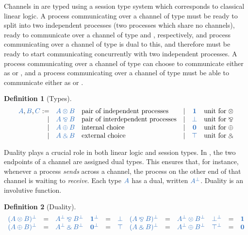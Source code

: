 \documentclass[draft,submission,copyright,creativecommons]{eptcs}
\newtheorem{definition}{Definition}
\begin{document}
Channels in \cp are typed using a session type system which corresponds to
classical linear logic.
A process communicating over a channel of type  must be ready to
split into two independent processes (two processes which share no
channels), ready to communicate over a channel of type  and ,
respectively, and process communicating over a channel of type  is
dual to this, and therefore must be ready to start communicating concurrently
with two independent processes.
A process communicating over a channel of type  can choose to
communicate either as  or , and a process communicating over a
channel of type  must be able to communicate either as  or
.
\begin{definition}[Types]\label{def:cp-types}
  \[
    \begin{array}{rclrcl}
      \ty{A}, \ty{B}, \ty{C}
           :=& \ty{A \tens B} &\text{pair of independent processes}
      &  \mid& \ty{\one}      &\text{unit for} \; {\tens}
      \\ \mid& \ty{A \parr B} &\text{pair of interdependent processes}
      &  \mid& \ty{\bot}      &\text{unit for} \; {\parr}
      \\ \mid& \ty{A \plus B} &\text{internal choice}
      &  \mid& \ty{\nil}      &\text{unit for} \; {\plus}
      \\ \mid& \ty{A \with B} &\text{external choice}
      &  \mid& \ty{\top}      &\text{unit for} \; {\with}
    \end{array}
  \]
\end{definition}
Duality plays a crucial role in both linear logic and session types.
In \cp, the two endpoints of a channel are assigned dual types.
This ensures that, for instance, whenever a process \emph{sends} across a
channel, the process on the other end of that channel is waiting to
\emph{receive}.
Each type $\ty{A}$ has a dual, written $\ty{A^\bot}$.
Duality is an involutive function.
\begin{definition}[Duality]\label{def:cp-negation}
  \[
    \begin{array}{lcllcllcllcl}
         \ty{(A \tens B)^\bot} &=& \ty{A^\bot \parr B^\bot}
      &  \ty{\one^\bot}        &=& \ty{\bot}
      &  \ty{(A \parr B)^\bot} &=& \ty{A^\bot \tens B^\bot}
      &  \ty{\bot^\bot}        &=& \ty{\one}
      \\ \ty{(A \plus B)^\bot} &=& \ty{A^\bot \with B^\bot}
      &  \ty{\nil^\bot}        &=& \ty{\top}
      &  \ty{(A \with B)^\bot} &=& \ty{A^\bot \plus B^\bot}
      &  \ty{\top^\bot}        &=& \ty{\nil}
    \end{array}
  \]
\end{definition}
\end{document}
